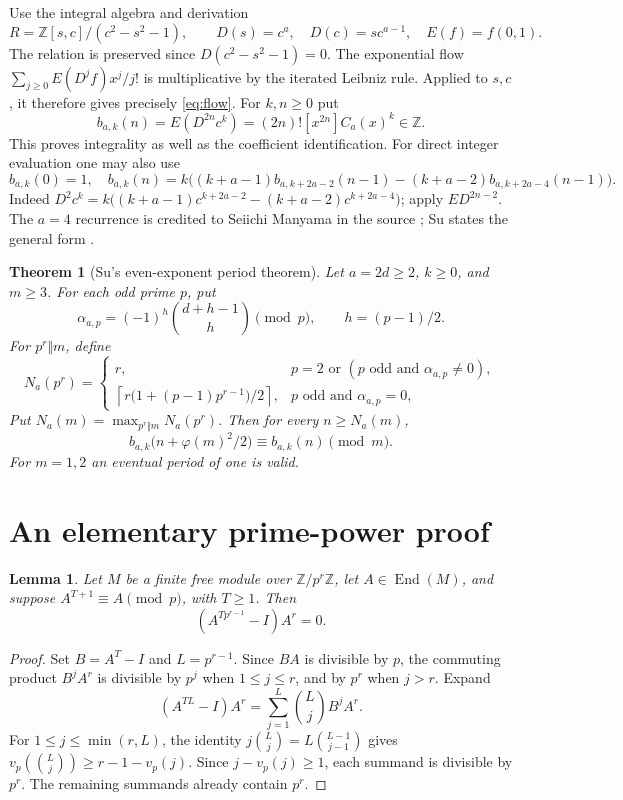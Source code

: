 \documentclass[11pt]{article}
\newtheorem{theorem}{Theorem}
\newtheorem{lemma}{Lemma}
\newcommand{\ZZ}{\mathbb Z}
\DeclareMathOperator{\End}{End}
\begin{document}
Use the integral algebra and derivation
\begin{equation}\label{eq:derivation}
 R=\ZZ[s,c]/(c^2-s^2-1),\qquad
 D(s)=c^a,\quad D(c)=sc^{a-1},\quad E(f)=f(0,1).
\end{equation}
The relation is preserved since $D(c^2-s^2-1)=0$. The exponential flow
$\sum_{j\ge0}E(D^jf)x^j/j!$ is multiplicative by the iterated Leibniz rule.
Applied to $s,c$, it therefore gives precisely \eqref{eq:flow}.
For $k,n\ge0$ put
\begin{equation}\label{eq:columns}
 b_{a,k}(n)=E(D^{2n}c^k)=(2n)![x^{2n}]C_a(x)^k\in\ZZ.
\end{equation}
This proves integrality as well as the coefficient identification.
For direct integer evaluation one may also use
\begin{equation}\label{eq:recurrence}
 b_{a,k}(0)=1,\quad
 b_{a,k}(n)=k\bigl((k+a-1)b_{a,k+2a-2}(n-1)
              -(k+a-2)b_{a,k+2a-4}(n-1)\bigr).
\end{equation}
Indeed $D^2c^k=k\bigl((k+a-1)c^{k+2a-2}-(k+a-2)c^{k+2a-4}\bigr)$;
apply $E D^{2n-2}$. The $a=4$ recurrence is credited to Seiichi Manyama
in the source \cite{oeis181}; Su states the general form
\cite[Lemma 3.1]{su}.

\begin{theorem}[Su's even-exponent period theorem]\label{thm:period}
Let $a=2d\ge2$, $k\ge0$, and $m\ge3$. For each odd prime $p$, put
\[
 \alpha_{a,p}=(-1)^h\binom{d+h-1}{h}\pmod p,\qquad h=(p-1)/2.
\]
For $p^r\Vert m$, define
\[
 N_a(p^r)=
 \begin{cases}
 r,&p=2\text{ or }(p\text{ odd and }\alpha_{a,p}\ne0),\\
 \left\lceil r\bigl(1+(p-1)p^{r-1}\bigr)/2\right\rceil,
      &p\text{ odd and }\alpha_{a,p}=0,
 \end{cases}
\]
Put $N_a(m)=\max_{p^r\Vert m}N_a(p^r)$. Then for every $n\ge N_a(m)$,
\begin{equation}\label{eq:uniform}
 b_{a,k}\bigl(n+\varphi(m)^2/2\bigr)\equiv b_{a,k}(n)\pmod m.
\end{equation}
For $m=1,2$ an eventual period of one is valid.
\end{theorem}

\section{An elementary prime-power proof}
\begin{lemma}\label{lem:lift}
Let $M$ be a finite free module over $\ZZ/p^r\ZZ$, let $A\in\End(M)$, and
suppose $A^{T+1}\equiv A\pmod p$, with $T\ge1$. Then
\[
 (A^{Tp^{r-1}}-I)A^r=0.
\]
\end{lemma}
\begin{proof}
Set $B=A^T-I$ and $L=p^{r-1}$. Since $BA$ is divisible by $p$, the commuting
product $B^jA^r$ is divisible by $p^j$ when $1\le j\le r$, and by $p^r$
when $j>r$. Expand
\[
 (A^{TL}-I)A^r=\sum_{j=1}^L\binom Lj B^jA^r.
\]
For $1\le j\le\min(r,L)$, the identity
$j\binom Lj=L\binom{L-1}{j-1}$ gives
$v_p(\binom Lj)\ge r-1-v_p(j)$. Since $j-v_p(j)\ge1$, each summand is
divisible by $p^r$. The remaining summands already contain $p^r$.
\end{proof}
\end{document}
